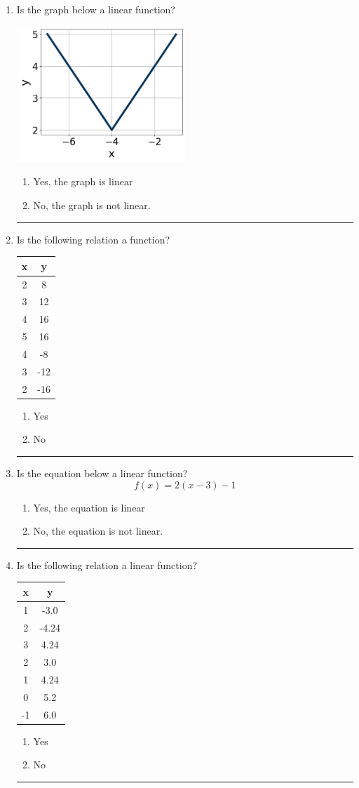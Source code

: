 \documentclass[14pt]{extbook}
\newcommand{\litem}[1]{\item#1\hspace*{-1cm}\rule{\textwidth}{0.4pt}}
\begin{document}
\begin{enumerate}
\litem{
Is the graph below a linear function?
\begin{center}
    \includegraphics[width=0.5\textwidth]{../Figures/MA_8_F_1_2_graphJ.png}
\end{center}
\begin{enumerate}[label=\Alph*.]
\item Yes, the graph is linear
\item No, the graph is not linear.

\end{enumerate} }
\litem{
Is the following relation a function?

\begin{tabular}{c|c}
x &y\tabularnewline \hline
2 &8\tabularnewline \hline
3 &12\tabularnewline \hline
4 &16\tabularnewline \hline
5 &16\tabularnewline \hline
4 &-8\tabularnewline \hline
3 &-12\tabularnewline \hline
2 &-16\end{tabular}\begin{enumerate}[label=\Alph*.]
\item Yes
\item No

\end{enumerate} }
\litem{
Is the equation below a linear function?\[ f(x) = 2(x -3)-1 \]\begin{enumerate}[label=\Alph*.]
\item Yes, the equation is linear
\item No, the equation is not linear.

\end{enumerate} }
\litem{
Is the following relation a linear function?

\begin{tabular}{c|c}
x &y\tabularnewline \hline
1 &-3.0\tabularnewline \hline
2 &-4.24\tabularnewline \hline
3 &4.24\tabularnewline \hline
2 &3.0\tabularnewline \hline
1 &4.24\tabularnewline \hline
0 &5.2\tabularnewline \hline
-1 &6.0\end{tabular}\begin{enumerate}[label=\Alph*.]
\item Yes
\item No

\end{enumerate} }
\end{enumerate}
\end{document}
